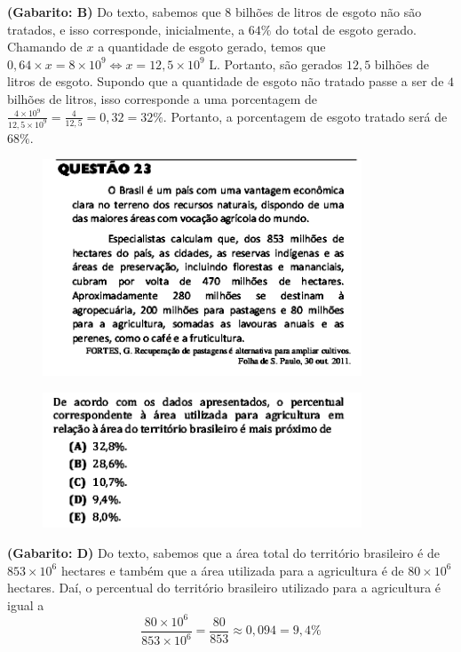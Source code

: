 \documentclass[a4paper]{article}
\begin{document}
\par\textbf{(Gabarito: B)} Do texto, sabemos que $8$ bilhões de litros de esgoto não são tratados, e isso corresponde, inicialmente, a $64\%$ do total de esgoto gerado. Chamando de $x$ a quantidade de esgoto gerado, temos que $0,64\times x = 8\times 10^9 \iff x = 12,5\times 10^9$ L. Portanto, são gerados $12,5$ bilhões de litros de esgoto. Supondo que a quantidade de esgoto não tratado passe a ser de $4$ bilhões de litros, isso corresponde a uma porcentagem de $\displaystyle{ \frac{4\times 10^9}{12,5\times 10^9} } = \frac{4}{12,5} = 0,32 = 32\%$. Portanto, a porcentagem de esgoto tratado será de $68\%$.	
\begin{figure}[H]
	\begin{center}
		\includegraphics[width=9.5cm]{L3Q23_1.png}
	\end{center}
\end{figure}
\begin{figure}[H]
	\begin{center}
		\includegraphics[width=9.5cm]{L3Q23_2.png}
	\end{center}
\end{figure}
\par\textbf{(Gabarito: D)} Do texto, sabemos que a área total do território brasileiro é de $853\times 10^6$ hectares e também que a área utilizada para a agricultura é de $80\times 10^6$ hectares. Daí, o percentual do território brasileiro utilizado para a agricultura é igual a
\begin{equation*}
\frac{80\times 10^6}{853\times 10^6} = \frac{80}{853} \approx 0,094 = 9,4\%
\end{equation*}
\end{document}
